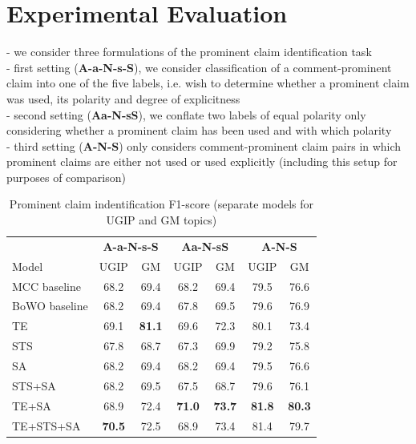 \section{Experimental Evaluation}

- we consider three formulations of the prominent claim identification task \\
- first setting (\textbf{A-a-N-s-S}), we consider classification of a comment-prominent claim
into one of the five labels, i.e. wish to determine whether a prominent claim was used, 
its polarity and degree of explicitness \\
- second setting (\textbf{Aa-N-sS}), we conflate two labels of equal polarity only considering
whether a prominent claim has been used and with which polarity \\
- third setting (\textbf{A-N-S}) only considers comment-prominent claim pairs in which prominent claims
are either not used or used explicitly (including this setup for purposes of comparison) \\

\begin{table}
\centering
{\small
\begin{tabular}{@{}l cc cc cc @{}}
\toprule
& 
\multicolumn{2}{c}{\textbf{A-a-N-s-S}} &
\multicolumn{2}{c}{\textbf{Aa-N-sS}} &
\multicolumn{2}{c}{\textbf{A-N-S}} \\
\cmidrule(lr){2-3}
\cmidrule(lr){4-5}
\cmidrule(lr){6-7}
Model & UGIP & GM & UGIP & GM & UGIP & GM \\ 
\midrule
MCC baseline  & 68.2 & 69.4 & 68.2 & 69.4  & 79.5 & 76.6        \\
BoWO baseline & 68.2 & 69.4 & 67.8 & 69.5 & 79.6 & 76.9        \\[1ex]
TE            & 69.1 & \textbf{81.1} & 69.6 & 72.3 & 80.1 & 73.4        \\
STS           & 67.8 & 68.7 & 67.3 & 69.9 & 79.2 & 75.8        \\
SA            & 68.2 & 69.4 & 68.2 & 69.4 & 79.5 & 76.6        \\[1ex]
STS+SA        & 68.2 & 69.5 & 67.5 & 68.7 & 79.6 & 76.1         \\
TE+SA         & 68.9 & 72.4 & \textbf{71.0} & \textbf{73.7} & \textbf{81.8} & \textbf{80.3}    \\[1ex]
TE+STS+SA   & \textbf{70.5} & 72.5 & 68.9 & 73.4 & 81.4 & 79.7        \\
\bottomrule
\end{tabular}}
\caption{Prominent claim indentification F1-score (separate models for UGIP and GM topics)}
\label{tab:claim_identification_results}
\end{table}

